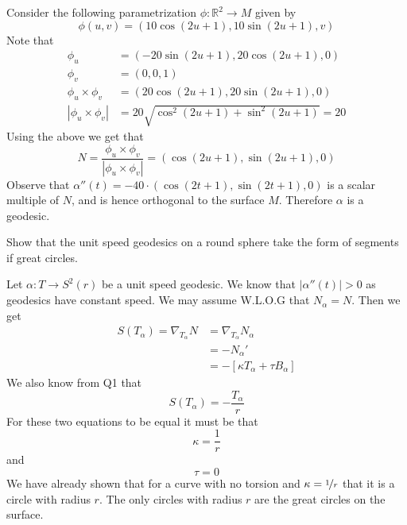 \documentclass[12pt, answers]{exam}
\begin{document}
\begin{questions}
        \begin{solution}
            Consider the following parametrization $\phi: \mathbb{R}^2 \rightarrow M$ given by
            \[ \phi(u, v) = \left( 10\cos(2u + 1), 10\sin(2u + 1), v \right)\]
            Note that
            \begin{align*}
                \phi_u &= (-20\sin \left(2u+1\right), 20\cos \left(2u+1\right), 0) \\
                \phi_v &= (0, 0, 1) \\
                \phi_u \times \phi_v &= \left(20\cos\left(2u+1\right), 20\sin \left(2u+1\right), 0\right) \\
                |\phi_u \times \phi_v| &= 20\sqrt{\cos ^2\left(2u+1\right)+\sin ^2\left(2u+1\right)} = 20
            \end{align*}
            Using the above we get that
            \[
                N = \frac{\phi_u \times \phi_v}{|\phi_u \times \phi_v|} = \left(\cos\left(2u+1\right), \sin \left(2u+1\right), 0\right)
            \]
            Observe that $\alpha''(t) = -40 \cdot \left(\cos\left(2t+1\right), \sin \left(2t+1\right), 0\right)$ is a scalar
            multiple of $N$, and is hence orthogonal to the surface $M$. Therefore $\alpha$ is a geodesic.
        \end{solution}

        \question Show that the unit speed geodesics on a round sphere take the form of segments if great circles.

        \begin{solution}
            Let $\alpha : T \rightarrow S^2(r)$ be a unit speed geodesic. We know that $|\alpha''(t)| > 0$ as geodesics have
            constant speed. We may assume W.L.O.G that $N_\alpha = N$. Then we get
            \begin{align*}
                S(T_\alpha) = \nabla_{T_\alpha}N &= \nabla_{T_\alpha}N_\alpha \\
                &= -N_\alpha' \\
                &= - \left[ \kappa T_\alpha + \tau B_\alpha \right]
            \end{align*}
            We also know from Q1 that
            \[ S(T_\alpha) = -\frac{T_\alpha}{r} \]
            For these two equations to be equal it must be that
            \[
                \kappa = \frac{1}{r}
            \]
            and
            \[
                \tau = 0
            \]
            We have already shown that for a curve with no torsion and $\kappa = \nicefrac{1}{r}$ that it is a circle with
            radius $r$. The only circles with radius $r$ are the great circles on the surface.
        \end{solution}
    \end{questions}
\end{document}
